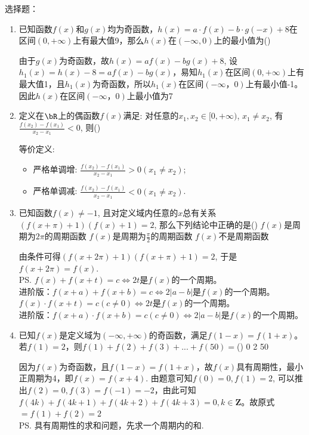 \clearpage
选择题：
\begin{enumerate}
    \item 已知函数$f(x)$和$g(x)$均为奇函数，$h(x) = a \cdot f(x) - b \cdot g(-x) + 8$在区间$(0, +\infty)$上有最大值9，那么$h(x)$在$(-\infty, 0)$上的最小值为\dotfill()
    \begin{jieda}
        由于$g(x)$为奇函数，故$h(x) = af(x) - bg(x) + 8$, 设$h_1(x) = h(x) - 8 = af(x) - bg(x)$，易知$h_1(x)$在区间$(0, +\infty)$上有最大值1，且$h_1(x)$为奇函数，所以$h_1(x)$在区间$(-\infty， 0)$上有最小值-1。因此$h(x)$在区间$(-\infty， 0)$上最小值为7
    \end{jieda}
    \item 定义在$\bR$上的偶函数$f(x)$满足: 对任意的$x_1,x_2\in[0,+\infty)$, $x_1\neq x_2$, 有$\frac{f(x_2)-f(x_1)}{x_2-x_1}<0$, 则\dotfill()
        \begin{jieda}
        等价定义: 
        \begin{itemize}
        \item 严格单调增: $\frac{f(x_2)-f(x_1)}{x_2-x_1}>0(x_1\neq x_2)$; 
        \item 严格单调减: $\frac{f(x_2)-f(x_1)}{x_2-x_1}<0(x_1\neq x_2)$. 
        \end{itemize}
    \end{jieda}
    \item 已知函数$f(x)\neq -1$, 且对定义域内任意的$x$总有关系$(f(x+\pi)+1)(f(x)+1)=2$, 那么下列结论中正确的是\dotfill()
    {$f(x)$是周期为$2\pi$的周期函数}
    {$f(x)$是周期为$\frac{\pi}{2}$的周期函数}
    {$f(x)$不是周期函数}
    \begin{jieda}
    由条件可得$(f(x+2\pi)+1)(f(x+\pi)+1)=2$, 于是$f(x+2\pi)=f(x)$. \\
    \ps $f(x) + f(x+t) = c\Leftrightarrow 2t$是$f(x)$的一个周期。\\
    进阶版：$f(x+a) + f(x+b) = c\Leftrightarrow 2|a-b|$是$f(x)$的一个周期。 \\
    $f(x) \cdot f(x+t) = c (c \neq 0)\Leftrightarrow 2t$是$f(x)$的一个周期。\\
    进阶版：$f(x+a) \cdot f(x+b) = c (c \neq 0)\Leftrightarrow 2|a-b|$是$f(x)$的一个周期。
    \end{jieda}
    \item 已知$f(x)$是定义域为$(-\infty, +\infty)$的奇函数，满足$f(1-x) = f(1+x)$。若$f(1) = 2$，则$f(1)+f(2)+f(3)+...+f(50) = $\dotfill()
    {0}
    {2}
    {50}
    \begin{jieda}
        因为$f(x)$为奇函数，且$f(1-x) = f(1+x)$，故$f(x)$具有周期性，最小正周期为4，即$f(x) = f(x+4)$. 由题意可知$f(0) = 0, f(1) = 2$, 可以推出$f(2) = 0, f(3) = f(-1) = -2$，由此可知$f(4k)+f(4k+1)+f(4k+2)+f(4k+3)=0, k \in \mathbf{Z}$。故原式$= f(1) + f(2) = 2$ \\
        \ps 具有周期性的求和问题，先求一个周期内的和.
    \end{jieda}
\end{enumerate}
